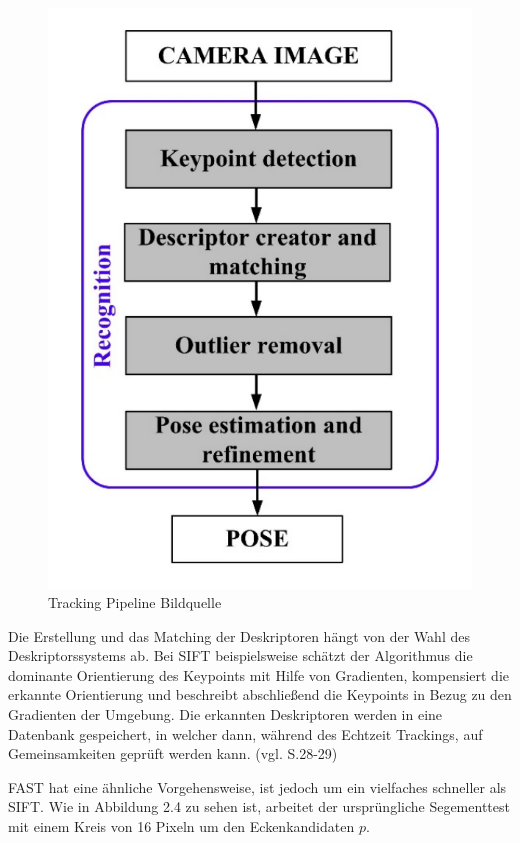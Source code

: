 \begin{figure}[H]
	\centering
	\includegraphics[scale=0.5]{tracking_pipeline.png}
	\caption{Tracking Pipeline Bildquelle \cite{natural_feature}}
\end{figure} 

Die Erstellung und das Matching der Deskriptoren hängt von der Wahl des Deskriptorssystems ab. Bei SIFT beispielsweise schätzt der Algorithmus die dominante Orientierung des Keypoints mit Hilfe von Gradienten, kompensiert die erkannte Orientierung und beschreibt abschließend die Keypoints in Bezug zu den Gradienten der Umgebung. Die erkannten Deskriptoren werden in eine Datenbank gespeichert, in welcher dann, während des Echtzeit Trackings, auf Gemeinsamkeiten geprüft werden kann.  (vgl. \cite{natural_feature} S.28-29) 


FAST hat eine ähnliche Vorgehensweise, ist jedoch um ein vielfaches schneller als SIFT. Wie in Abbildung 2.4 zu sehen ist, arbeitet der ursprüngliche Segementtest mit einem Kreis von 16 Pixeln um den Eckenkandidaten $p$. 


